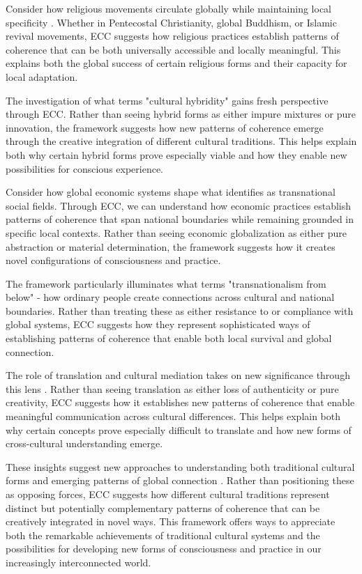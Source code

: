 Consider how religious movements circulate globally while maintaining local specificity \cite{comaroff2009ethnicity}. Whether in Pentecostal Christianity, global Buddhism, or Islamic revival movements, ECC suggests how religious practices establish patterns of coherence that can be both universally accessible and locally meaningful. This explains both the global success of certain religious forms and their capacity for local adaptation.

The investigation of what \cite{kraidy2005hybridity} terms "cultural hybridity" gains fresh perspective through ECC. Rather than seeing hybrid forms as either impure mixtures or pure innovation, the framework suggests how new patterns of coherence emerge through the creative integration of different cultural traditions. This helps explain both why certain hybrid forms prove especially viable and how they enable new possibilities for conscious experience.

Consider how global economic systems shape what \cite{sassen2007sociology} identifies as transnational social fields. Through ECC, we can understand how economic practices establish patterns of coherence that span national boundaries while remaining grounded in specific local contexts. Rather than seeing economic globalization as either pure abstraction or material determination, the framework suggests how it creates novel configurations of consciousness and practice.

The framework particularly illuminates what \cite{vertovec2009transnationalism} terms "transnationalism from below" - how ordinary people create connections across cultural and national boundaries. Rather than treating these as either resistance to or compliance with global systems, ECC suggests how they represent sophisticated ways of establishing patterns of coherence that enable both local survival and global connection.

The role of translation and cultural mediation takes on new significance through this lens \cite{tomlinson1999globalization}. Rather than seeing translation as either loss of authenticity or pure creativity, ECC suggests how it establishes new patterns of coherence that enable meaningful communication across cultural differences. This helps explain both why certain concepts prove especially difficult to translate and how new forms of cross-cultural understanding emerge.

These insights suggest new approaches to understanding both traditional cultural forms and emerging patterns of global connection \cite{appadurai1996modernity}. Rather than positioning these as opposing forces, ECC suggests how different cultural traditions represent distinct but potentially complementary patterns of coherence that can be creatively integrated in novel ways. This framework offers ways to appreciate both the remarkable achievements of traditional cultural systems and the possibilities for developing new forms of consciousness and practice in our increasingly interconnected world.

